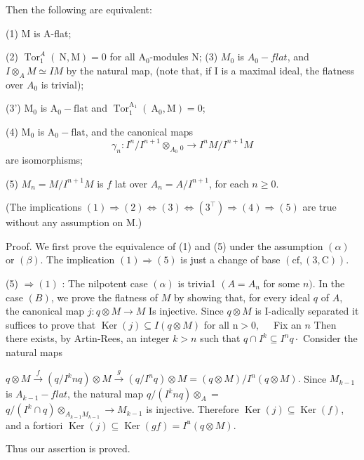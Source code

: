Then the following are equivalent:

(1) M is A-flat;

(2) $\operatorname{Tor}_{1}^{A}(\mathrm{~N}, \mathrm{M})=0$ for all $\mathrm{A}_{0}$-modules $\mathrm{N}$; (3) $M_{0}$ is $A_{0}-f l a t$, and $I \otimes_{A} M \simeq I M$ by the natural map, (note that, if I is a maximal ideal, the flatness over $A_{0}$ is trivial);

(3') $\mathrm{M}_{0}$ is $\mathrm{A}_{0}-\mathrm{flat}$ and $\operatorname{Tor}_{1}^{\mathrm{A}_{1}}\left(\mathrm{~A}_{0}, \mathrm{M}\right)=0$;

(4) $\mathrm{M}_{0}$ is $\mathrm{A}_{0}-\mathrm{flat}$, and the canonical maps
$$
\gamma_{n}: I^{n} / I^{n+1} \otimes_{A_{0}}{ }_{0} \rightarrow I^{n} M / I^{n+1} M
$$
are isomorphisms;

(5) $M_{n}=M / I^{n+1} M$ is $f$ lat over $A_{n}=A / I^{n+1}$, for each $n \geqslant 0$.

(The implications $(1) \Rightarrow(2) \Leftrightarrow(3) \Leftrightarrow\left(3^{\top}\right) \Rightarrow(4) \Rightarrow(5)$ are true without any assumption on M.)

Proof. We first prove the equivalence of (1) and (5) under the assumption $(\alpha)$ or $(\beta)$. The implication $(1) \Rightarrow(5)$ is just a change of base $(\mathrm{cf},(3, \mathrm{C}))$.

(5) $\Rightarrow(1)$ : The nilpotent case $(\alpha)$ is trivia1 $\left(A=A_{n}\right.$ for some $n)$. In the case $(B)$, we prove the flatness of $M$ by showing that, for every ideal $q$ of $A$, the canonical map $j: q \otimes M \rightarrow M$ Is injective. Since $q \otimes M$ is I-adically separated it suffices to prove that $\operatorname{Ker}(j) \subseteq I(q \otimes M)$ for all $\mathrm{n}>0, \quad$ Fix an $n$ Then there exists, by Artin-Rees, an integer $k>n$ such that $q \cap I^{k} \subseteq I^{n} q \cdot$ Consider the natural maps

$q \otimes M \stackrel{f}{\rightarrow}\left(q / I^{k} n q\right) \otimes M \stackrel{g}{\rightarrow}\left(q / I^{n} q\right) \otimes M=(q \otimes M) / I^{n}(q \otimes M) .$ Since $M_{k-1}$ is $A_{k-1}-f l a t$, the natural map $q /\left(I^{k} n q\right) \otimes_{A}=$ $q /\left(I^{k} \cap q\right) \otimes_{A_{k-1} M_{k-1}} \rightarrow M_{k-1}$ is injective. Therefore $\operatorname{Ker}(j) \subseteq \operatorname{Ker}(f)$, and a fortiori $\operatorname{Ker}(j) \subseteq \operatorname{Ker}(g f)=I^{\mathrm{n}}(q \otimes M)$.

Thus our assertion is proved.

